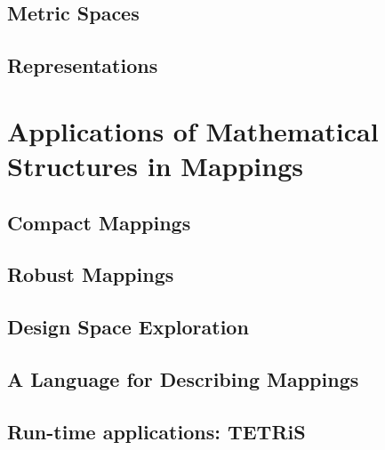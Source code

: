 \documentclass[
		twoside,openright,titlepage,numbers=noenddot,headinclude,%
	 	footinclude=true,cleardoublepage=empty,
		dottedtoc, %
		BCOR=5mm,paper=a4,fontsize=10pt, %
		ngerman,american, %
		]{scrreprt}
\begin{document}
\section{Metric Spaces}
\label{sec:metric}
\section{Representations}
\label{sec:representations}
%

\chapter{Applications of Mathematical Structures in Mappings}
\label{chap:mapping_applications}

\section{Compact Mappings}
\label{sec:compact}
\section{Robust Mappings}
\label{sec:design_centering}
\section{Design Space Exploration}
\label{sec:dse}
%
\section{A Language for Describing Mappings}
\label{sec:logic_language}
\section{Run-time applications: TETRiS}
\label{sec:tetris}
\end{document}
